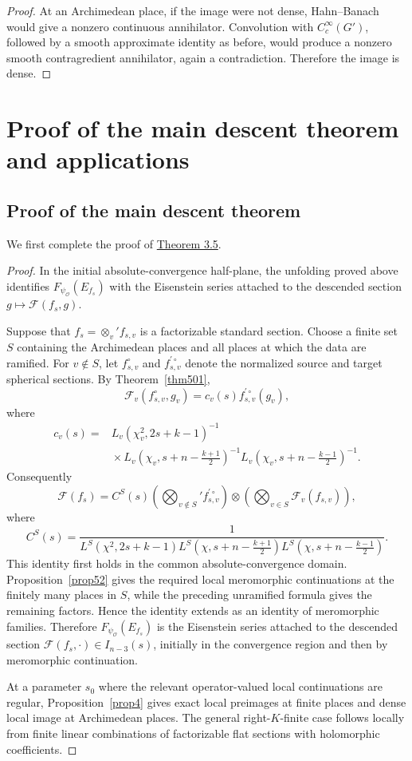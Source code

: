 \documentclass[11pt,notitlepage]{amsart}
\theoremstyle{definition}
\theoremstyle{remark}
\newcommand{\calF}{\mathcal{F}}
\newcommand{\calO}{\mathcal{O}}
\begin{document}
\begin{proof}
At an Archimedean place, if the image were not dense, Hahn--Banach would
give a nonzero continuous annihilator. Convolution with
\(C_c^\infty(G')\), followed by a smooth approximate identity as before, would
produce a nonzero smooth contragredient annihilator, again a
contradiction. Therefore the image is dense.
\end{proof}

\section{Proof of the main descent theorem and applications}\label{sec:applications}

\subsection{Proof of the main descent theorem}

We first complete the proof of \hyperref[thm401]{Theorem 3.5}.

\begin{proof}
In the initial absolute-convergence half-plane, the unfolding proved
above identifies $F_{\psi_{\calO}}(E_{f_s})$ with the Eisenstein series
attached to the descended section $g\longmapsto\calF(f_s,g)$.

Suppose that $f_s=\otimes_v'f_{s,v}$ is a factorizable standard section.
Choose a finite set $S$ containing the Archimedean places and all places
at which the data are ramified. For $v\notin S$, let
$f_{s,v}^{\circ}$ and $f_{s,v}^{\prime\circ}$ denote the normalized
source and target spherical sections. By Theorem~\ref{thm501},
\[
 \calF_v(f_{s,v}^{\circ},g_v)
 =c_v(s)f_{s,v}^{\prime\circ}(g_v),
\]
where
\[
\begin{aligned}
c_v(s)={}&L_v(\chi_v^2,2s+k-1)^{-1}\\
&{}\times
L_v\left(\chi_v,s+n-\frac{k+1}{2}\right)^{-1}
L_v\left(\chi_v,s+n-\frac{k-1}{2}\right)^{-1}.
\end{aligned}
\]
Consequently
\[
 \calF(f_s)=C^S(s)
 \left(\bigotimes_{v\notin S}'f_{s,v}^{\prime\circ}\right)
 \otimes\left(\bigotimes_{v\in S}\calF_v(f_{s,v})\right),
\]
where
\[
C^S(s)=
\frac{1}{
L^S(\chi^2,2s+k-1)
L^S\left(\chi,s+n-\frac{k+1}{2}\right)
L^S\left(\chi,s+n-\frac{k-1}{2}\right)}.
\]
This identity first holds in the common absolute-convergence domain.
Proposition~\ref{prop52} gives the required local meromorphic
continuations at the finitely many places in $S$, while the preceding
unramified formula gives the remaining factors. Hence the identity
extends as an identity of meromorphic families. Therefore
$F_{\psi_{\calO}}(E_{f_s})$ is the Eisenstein series attached to the
descended section $\calF(f_s,\cdot)\in I_{n-3}(s)$, initially in the
convergence region and then by meromorphic continuation.

At a parameter $s_0$ where the relevant operator-valued local
continuations are regular, Proposition~\ref{prop4} gives exact local
preimages at finite places and dense local image at Archimedean places.
The general right-$K$-finite case follows locally from finite linear
combinations of factorizable flat sections with holomorphic coefficients.
\end{proof}
\end{document}

